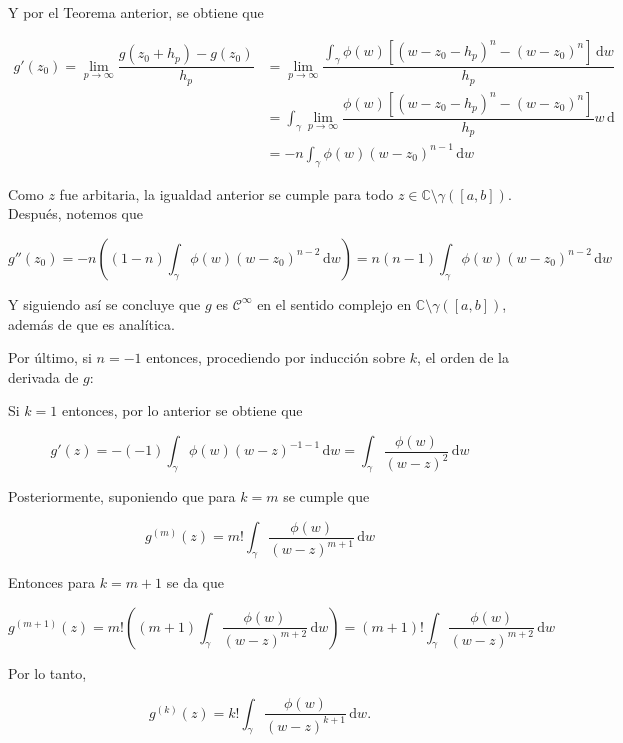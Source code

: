 \documentclass[12pt, fleqn]{article}
\newcommand{\complejos}{\mathbb{C}}
\newcommand{\clase}[1]{$ \mathcal{C}^#1 $}
\newcommand{\integ}[3]{\int_{#1} #2 \, \mathrm{d} #3}
\begin{document}
	Y por el Teorema anterior, se obtiene que

	\begin{align*}
		g'(z_0) = \lim_{p \to \infty} \dfrac{g(z_0 + h_p) - g(z_0)}{h_p} &= \lim_{p \to \infty} \dfrac{\integ{\gamma}{\phi(w) \left[ (w - z_0 - h_p)^n - (w - z_0)^n \right] }{w}}{h_p} \\
		&= \integ{\gamma}{\lim_{p \to \infty} \dfrac{\phi(w) \left[ (w - z_0 - h_p)^n - (w - z_0)^n \right] }{h_p}{w}} \\
		&= -n \integ{\gamma}{\phi(w) (w - z_0)^{n-1}}{w}
	\end{align*}

	Como $ z $ fue arbitaria, la igualdad anterior se cumple para todo $ z \in \complejos \setminus \gamma([a,b]) $. Después, notemos que 

	\begin{equation*}
		g''(z_0) = -n \left( (1-n) \integ{\gamma}{\phi(w) (w - z_0)^{n-2}}{w} \right) = n(n-1) \integ{\gamma}{\phi(w) (w - z_0)^{n-2}}{w}
	\end{equation*}

	Y siguiendo así se concluye que $ g $ es \clase{\infty} en el sentido complejo en $ \complejos \setminus \gamma([a,b]) $, además de que es analítica.

	Por último, si $ n = -1 $ entonces, procediendo por inducción sobre $k$, el orden de la derivada de $g$:

	Si $ k = 1 $ entonces, por lo anterior se obtiene que 

	\begin{equation*}
		g'(z) = -(-1) \integ{\gamma}{\phi(w) (w - z)^{-1-1}}{w} = \integ{\gamma}{\dfrac{\phi(w)}{(w-z)^2}}{w}
	\end{equation*}

	Posteriormente, suponiendo que para $ k = m $ se cumple que

	\begin{equation*}
		g^{(m)} (z) = m! \integ{\gamma}{\dfrac{\phi(w)}{(w-z)^{m+1}}}{w}
	\end{equation*}

	Entonces para $ k = m + 1 $ se da que

	\begin{equation*}
		g^{(m+1)} (z) = m! \left( (m+1) \integ{\gamma}{\dfrac{\phi(w)}{(w-z)^{m+2}}}{w} \right) = (m+1)! \integ{\gamma}{\dfrac{\phi(w)}{(w-z)^{m+2}}}{w}
	\end{equation*}

	Por lo tanto, 

	\begin{equation*}
		g^{(k)} (z) = k! \integ{\gamma}{\dfrac{\phi(w)}{(w-z)^{k+1}}}{w}.
	\end{equation*}
\end{document}
